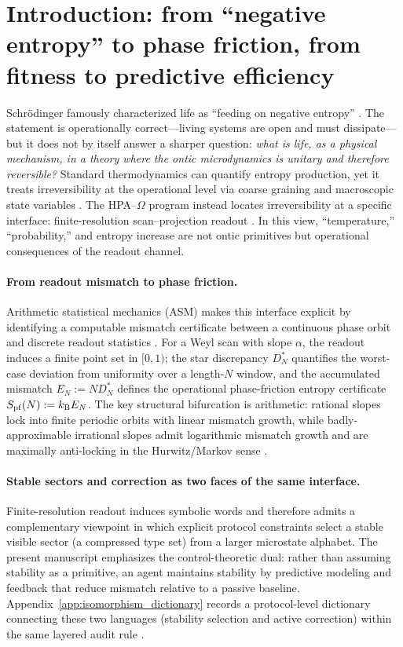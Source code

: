 \section{Introduction: from ``negative entropy'' to phase friction, from fitness to predictive efficiency}
\label{sec:introduction}

Schr\"odinger famously characterized life as ``feeding on negative entropy'' \cite{Schrodinger1944}. The statement is operationally correct---living systems are open and must dissipate---but it does not by itself answer a sharper question: \emph{what is life, as a physical mechanism, in a theory where the ontic microdynamics is unitary and therefore reversible?}
Standard thermodynamics can quantify entropy production, yet it treats irreversibility at the operational level via coarse graining and macroscopic state variables \cite{Callen1985}.
The HPA--$\Omega$ program instead locates irreversibility at a specific interface: finite-resolution scan--projection readout \cite{Ma2025HPA,Ma2025FoP,Ma2025HPOT}.
In this view, ``temperature,'' ``probability,'' and entropy increase are not ontic primitives but operational consequences of the readout channel.

\paragraph{From readout mismatch to phase friction.}
Arithmetic statistical mechanics (ASM) makes this interface explicit by identifying a computable mismatch certificate between a continuous phase orbit and discrete readout statistics \cite{Ma2025HPT}.
For a Weyl scan with slope $\alpha$, the readout induces a finite point set in $[0,1)$; the star discrepancy $D_N^\ast$ quantifies the worst-case deviation from uniformity over a length-$N$ window, and the accumulated mismatch $E_N := N D_N^\ast$ defines the operational phase-friction entropy certificate $S_{\mathrm{pf}}(N):=k_{\mathrm{B}} E_N$.
The key structural bifurcation is arithmetic: rational slopes lock into finite periodic orbits with linear mismatch growth, while badly-approximable irrational slopes admit logarithmic mismatch growth and are maximally anti-locking in the Hurwitz/Markov sense \cite{KuipersNiederreiter1974,Cassels1957}.

\paragraph{Stable sectors and correction as two faces of the same interface.}
Finite-resolution readout induces symbolic words and therefore admits a complementary viewpoint in which explicit protocol constraints select a stable visible sector (a compressed type set) from a larger microstate alphabet.
The present manuscript emphasizes the control-theoretic dual: rather than assuming stability as a primitive, an agent maintains stability by predictive modeling and feedback that reduce mismatch relative to a passive baseline.
Appendix~\ref{app:isomorphism_dictionary} records a protocol-level dictionary connecting these two languages (stability selection and active correction) within the same layered audit rule \cite{Ma2025RF,Ma2025Z128SM}.

